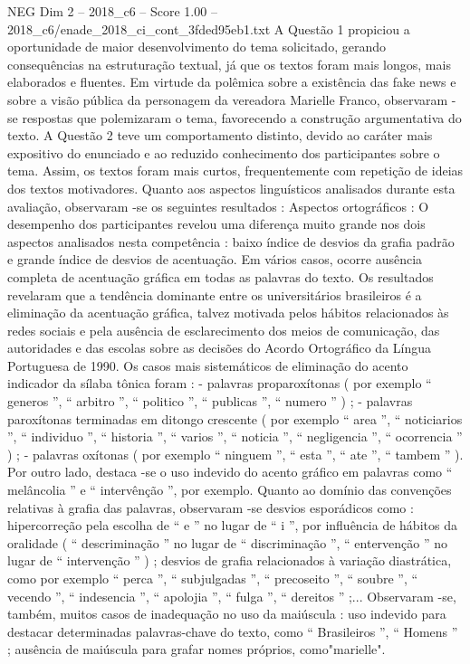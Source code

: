 \begin{textsample}{NEG Dim 2 – 2018\_c6 – Score 1.00 – 2018\_c6/enade\_2018\_ci\_cont\_3fded95eb1.txt}
A Questão 1 propiciou a oportunidade de maior desenvolvimento do tema solicitado, gerando consequências na estruturação textual, já que os textos foram mais longos, mais elaborados e fluentes.
Em virtude da polêmica sobre a existência das fake news e sobre a visão pública da personagem da vereadora Marielle Franco, observaram -se respostas que polemizaram o tema, favorecendo a construção argumentativa do texto.
A Questão 2 teve um comportamento distinto, devido ao caráter mais expositivo do enunciado e ao reduzido conhecimento dos participantes sobre o tema.
Assim, os textos foram mais curtos, frequentemente com repetição de ideias dos textos motivadores.
Quanto aos aspectos linguísticos analisados durante esta avaliação, observaram -se os seguintes resultados : Aspectos ortográficos : O desempenho dos participantes revelou uma diferença muito grande nos dois aspectos analisados nesta competência : baixo índice de desvios da grafia padrão e grande índice de desvios de acentuação.
Em vários casos, ocorre ausência completa de acentuação gráfica em todas as palavras do texto.
Os resultados revelaram que a tendência dominante entre os universitários brasileiros é a eliminação da acentuação gráfica, talvez motivada pelos hábitos relacionados às redes sociais e pela ausência de esclarecimento dos meios de comunicação, das autoridades e das escolas sobre as decisões do Acordo Ortográfico da Língua Portuguesa de 1990.
Os casos mais sistemáticos de eliminação do acento indicador da sílaba tônica foram : - palavras proparoxítonas ( por exemplo “ generos ”, “ arbitro ”, “ politico ”, “ publicas ”, “ numero ” ) ; - palavras paroxítonas terminadas em ditongo crescente ( por exemplo “ area ”, “ noticiarios ”, “ individuo ”, “ historia ”, “ varios ”, “ noticia ”, “ negligencia ”, “ ocorrencia ” ) ; - palavras oxítonas ( por exemplo “ ninguem ”, “ esta ”, “ ate ”, “ tambem ” ).
Por outro lado, destaca -se o uso indevido do acento gráfico em palavras como “ melâncolia ” e “ intervênção ”, por exemplo.
Quanto ao domínio das convenções relativas à grafia das palavras, observaram -se desvios esporádicos como : hipercorreção pela escolha de “ e ” no lugar de “ i ”, por influência de hábitos da oralidade ( “ descriminação ” no lugar de “ discriminação ”, “ entervenção ” no lugar de “ intervenção ” ) ; desvios de grafia relacionados à variação diastrática, como por exemplo “ perca ”, “ subjulgadas ”, “ precoseito ”, “ soubre ”, “ vecendo ”, “ indesencia ”, “ apolojia ”, “ fulga ”, “ dereitos ” ;...
Observaram -se, também, muitos casos de inadequação no uso da maiúscula : uso indevido para destacar determinadas palavras-chave do texto, como “ Brasileiros ”, “ Homens ” ; ausência de maiúscula para grafar nomes próprios, como"marielle".

\end{textsample}
